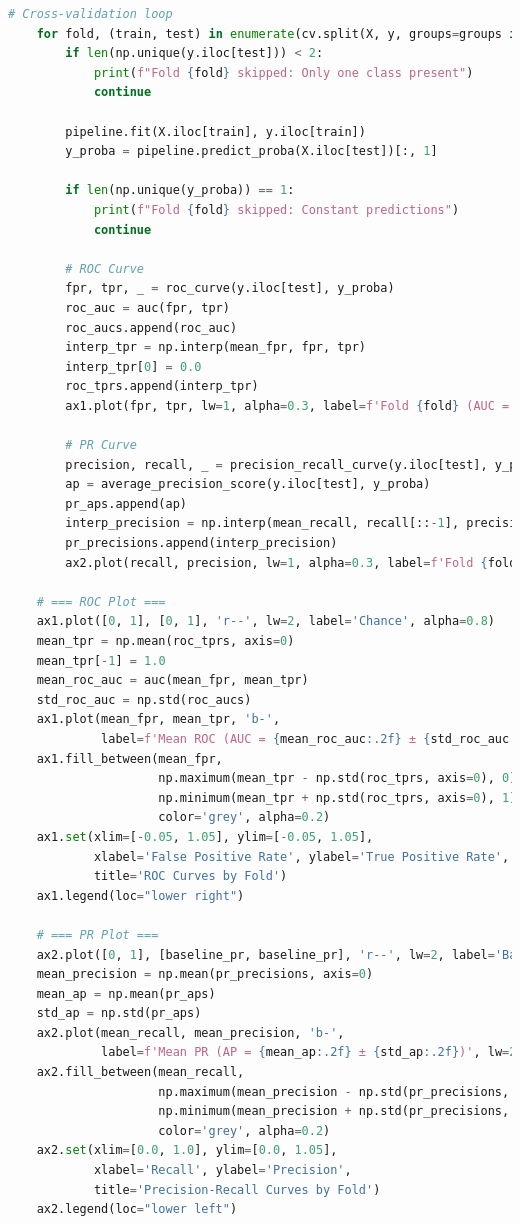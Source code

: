\documentclass[12pt]{report}
\begin{document}
\begin{lstlisting}[language=Python,caption={common\_ml.py: Κοινές συναρτήσεις για test, cross-validation, κατασκευή plot}, label=lst:commonml]
    # Cross-validation loop
    for fold, (train, test) in enumerate(cv.split(X, y, groups=groups if groups is not None else y)):
        if len(np.unique(y.iloc[test])) < 2:
            print(f"Fold {fold} skipped: Only one class present")
            continue

        pipeline.fit(X.iloc[train], y.iloc[train])
        y_proba = pipeline.predict_proba(X.iloc[test])[:, 1]

        if len(np.unique(y_proba)) == 1:
            print(f"Fold {fold} skipped: Constant predictions")
            continue

        # ROC Curve
        fpr, tpr, _ = roc_curve(y.iloc[test], y_proba)
        roc_auc = auc(fpr, tpr)
        roc_aucs.append(roc_auc)
        interp_tpr = np.interp(mean_fpr, fpr, tpr)
        interp_tpr[0] = 0.0
        roc_tprs.append(interp_tpr)
        ax1.plot(fpr, tpr, lw=1, alpha=0.3, label=f'Fold {fold} (AUC = {roc_auc:.2f})')

        # PR Curve
        precision, recall, _ = precision_recall_curve(y.iloc[test], y_proba)
        ap = average_precision_score(y.iloc[test], y_proba)
        pr_aps.append(ap)
        interp_precision = np.interp(mean_recall, recall[::-1], precision[::-1])
        pr_precisions.append(interp_precision)
        ax2.plot(recall, precision, lw=1, alpha=0.3, label=f'Fold {fold} (AP = {ap:.2f})')

    # === ROC Plot ===
    ax1.plot([0, 1], [0, 1], 'r--', lw=2, label='Chance', alpha=0.8)
    mean_tpr = np.mean(roc_tprs, axis=0)
    mean_tpr[-1] = 1.0
    mean_roc_auc = auc(mean_fpr, mean_tpr)
    std_roc_auc = np.std(roc_aucs)
    ax1.plot(mean_fpr, mean_tpr, 'b-',
             label=f'Mean ROC (AUC = {mean_roc_auc:.2f} ± {std_roc_auc:.2f})', lw=2)
    ax1.fill_between(mean_fpr,
                     np.maximum(mean_tpr - np.std(roc_tprs, axis=0), 0),
                     np.minimum(mean_tpr + np.std(roc_tprs, axis=0), 1),
                     color='grey', alpha=0.2)
    ax1.set(xlim=[-0.05, 1.05], ylim=[-0.05, 1.05],
            xlabel='False Positive Rate', ylabel='True Positive Rate',
            title='ROC Curves by Fold')
    ax1.legend(loc="lower right")

    # === PR Plot ===
    ax2.plot([0, 1], [baseline_pr, baseline_pr], 'r--', lw=2, label='Baseline', alpha=0.8)
    mean_precision = np.mean(pr_precisions, axis=0)
    mean_ap = np.mean(pr_aps)
    std_ap = np.std(pr_aps)
    ax2.plot(mean_recall, mean_precision, 'b-',
             label=f'Mean PR (AP = {mean_ap:.2f} ± {std_ap:.2f})', lw=2)
    ax2.fill_between(mean_recall,
                     np.maximum(mean_precision - np.std(pr_precisions, axis=0), 0),
                     np.minimum(mean_precision + np.std(pr_precisions, axis=0), 1),
                     color='grey', alpha=0.2)
    ax2.set(xlim=[0.0, 1.0], ylim=[0.0, 1.05],
            xlabel='Recall', ylabel='Precision',
            title='Precision-Recall Curves by Fold')
    ax2.legend(loc="lower left")


\end{lstlisting}
\end{document}

